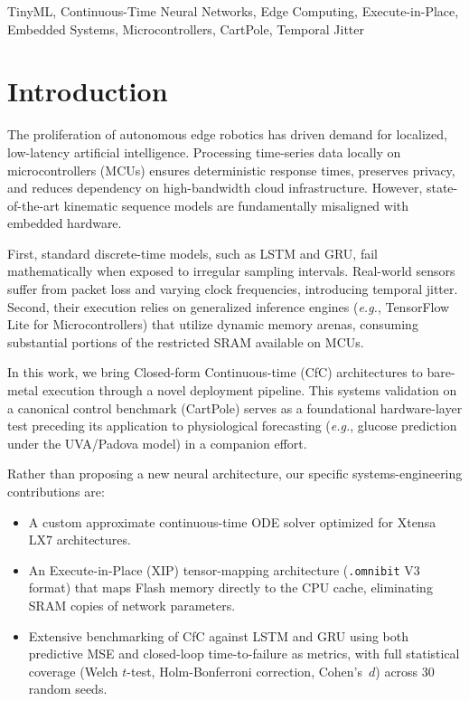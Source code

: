 \documentclass[conference]{IEEEtran}
\begin{document}
\begin{IEEEkeywords}
TinyML, Continuous-Time Neural Networks, Edge Computing, Execute-in-Place,
Embedded Systems, Microcontrollers, CartPole, Temporal Jitter
\end{IEEEkeywords}

\section{Introduction}
The proliferation of autonomous edge robotics has driven demand for localized,
low-latency artificial intelligence. Processing time-series data locally on
microcontrollers (MCUs) ensures deterministic response times, preserves
privacy, and reduces dependency on high-bandwidth cloud infrastructure.
However, state-of-the-art kinematic sequence models are fundamentally
misaligned with embedded hardware.

First, standard discrete-time models, such as LSTM and GRU, fail
mathematically when exposed to irregular sampling intervals. Real-world sensors
suffer from packet loss and varying clock frequencies, introducing temporal
jitter. Second, their execution relies on generalized inference engines (\emph{e.g.},
TensorFlow Lite for Microcontrollers) that utilize dynamic memory arenas,
consuming substantial portions of the restricted SRAM available on MCUs.

In this work, we bring Closed-form Continuous-time (CfC) architectures
\cite{hasani2022closed} to bare-metal execution through a novel deployment
pipeline.
This systems validation on a canonical control benchmark (CartPole) serves as
a foundational hardware-layer test preceding its application to physiological
forecasting (\emph{e.g.}, glucose prediction under the UVA/Padova model) in a
companion effort.

Rather than proposing a new neural architecture, our specific
systems-engineering contributions are:
\begin{itemize}
  \item[(1)] A custom approximate continuous-time ODE solver optimized for
    Xtensa LX7 architectures.
  \item[(2)] An Execute-in-Place (XIP) tensor-mapping architecture
    (\texttt{.omnibit} V3 format) that maps Flash memory directly to the CPU
    cache, eliminating SRAM copies of network parameters.
  \item[(3)] Extensive benchmarking of CfC against LSTM and GRU using both
    predictive MSE and closed-loop time-to-failure as metrics, with full
    statistical coverage (Welch $t$-test, Holm-Bonferroni correction,
    Cohen's~$d$) across 30 random seeds.
\end{itemize}
\end{document}
